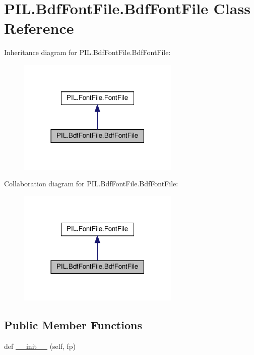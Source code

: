 \hypertarget{classPIL_1_1BdfFontFile_1_1BdfFontFile}{}\section{P\+I\+L.\+Bdf\+Font\+File.\+Bdf\+Font\+File Class Reference}
\label{classPIL_1_1BdfFontFile_1_1BdfFontFile}


Inheritance diagram for P\+I\+L.\+Bdf\+Font\+File.\+Bdf\+Font\+File\+:
\nopagebreak
\begin{figure}[H]
\begin{center}
\leavevmode
\includegraphics[width=218pt]{classPIL_1_1BdfFontFile_1_1BdfFontFile__inherit__graph}
\end{center}
\end{figure}


Collaboration diagram for P\+I\+L.\+Bdf\+Font\+File.\+Bdf\+Font\+File\+:
\nopagebreak
\begin{figure}[H]
\begin{center}
\leavevmode
\includegraphics[width=218pt]{classPIL_1_1BdfFontFile_1_1BdfFontFile__coll__graph}
\end{center}
\end{figure}
\subsection*{Public Member Functions}
\begin{DoxyCompactItemize}
\item 
def \hyperlink{classPIL_1_1BdfFontFile_1_1BdfFontFile_ada04488978c5952212889588238871d6}{\+\_\+\+\_\+init\+\_\+\+\_\+} (self, fp)
\end{DoxyCompactItemize}
